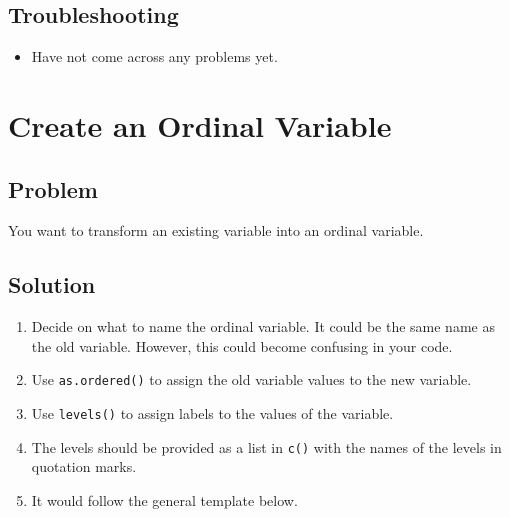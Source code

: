 \documentclass[
]{book}
\newenvironment{Shaded}{\begin{snugshade}}{\end{snugshade}}
\newcommand{\CommentTok}[1]{\textcolor[rgb]{0.56,0.35,0.01}{\textit{#1}}}
\newcommand{\FunctionTok}[1]{\textcolor[rgb]{0.13,0.29,0.53}{\textbf{#1}}}
\newcommand{\NormalTok}[1]{#1}
\newcommand{\OtherTok}[1]{\textcolor[rgb]{0.56,0.35,0.01}{#1}}
\newcommand{\SpecialCharTok}[1]{\textcolor[rgb]{0.81,0.36,0.00}{\textbf{#1}}}
\newcommand{\StringTok}[1]{\textcolor[rgb]{0.31,0.60,0.02}{#1}}
\providecommand{\tightlist}{%
  \setlength{\itemsep}{0pt}\setlength{\parskip}{0pt}}
\begin{document}
\hypertarget{troubleshooting-15}{%
\subsection{Troubleshooting}\label{troubleshooting-15}}

\begin{itemize}
\tightlist
\item
  Have not come across any problems yet.
\end{itemize}

\hypertarget{ordinal}{%
\section{Create an Ordinal Variable}\label{ordinal}}

\hypertarget{problem-19}{%
\subsection{Problem}\label{problem-19}}

You want to transform an existing variable into an ordinal variable.

\hypertarget{solution-18}{%
\subsection{Solution}\label{solution-18}}

\begin{enumerate}
\def\labelenumi{\arabic{enumi}.}
\tightlist
\item
  Decide on what to name the ordinal variable. It could be the same name as the old variable. However, this could become confusing in your code.
\item
  Use \texttt{as.ordered()} to assign the old variable values to the new variable.
\item
  Use \texttt{levels()} to assign labels to the values of the variable.
\item
  The levels should be provided as a list in \texttt{c()} with the names of the levels in quotation marks.
\item
  It would follow the general template below.
\end{enumerate}

\begin{Shaded}
\end{Shaded}
\end{document}
